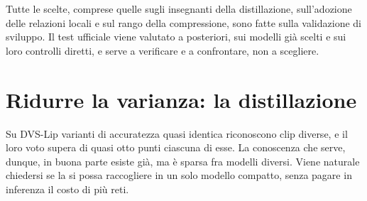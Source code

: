Tutte le scelte, comprese quelle sugli insegnanti della distillazione, sull'adozione delle relazioni locali e sul rango della compressione, sono fatte sulla validazione di sviluppo. Il test ufficiale viene valutato a posteriori, sui modelli già scelti e sui loro controlli diretti, e serve a verificare e a confrontare, non a scegliere.



\section{Ridurre la varianza: la distillazione}
\label{sec:distillazione}

Su DVS-Lip varianti di accuratezza quasi identica riconoscono clip diverse, e il loro voto supera di quasi otto punti ciascuna di esse. La conoscenza che serve, dunque, in buona parte esiste già, ma è sparsa fra modelli diversi. Viene naturale chiedersi se la si possa raccogliere in un solo modello compatto, senza pagare in inferenza il costo di più reti.

